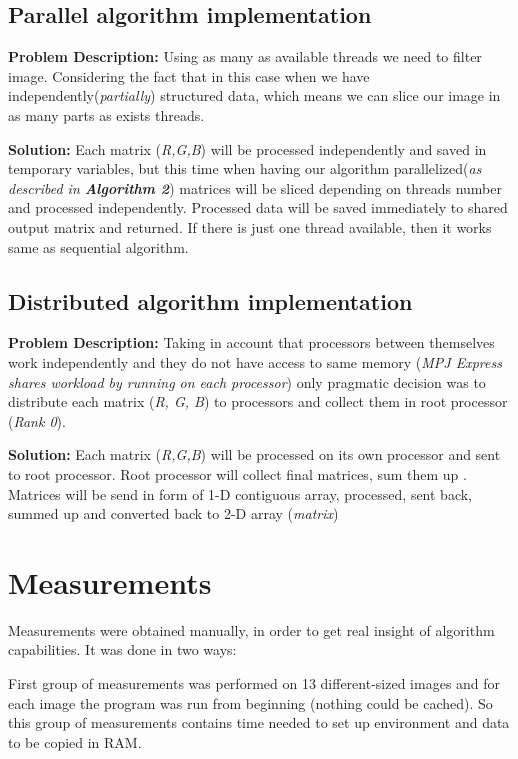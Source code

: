 \documentclass{article}
\begin{document}
\subsection{Parallel algorithm implementation}
\textbf{Problem Description:} Using as many as available threads we need to filter image. Considering the fact that in this case when we have independently(\textit{partially}) structured data, which means we can slice our image in as many parts as exists threads. 

\textbf{Solution:} Each matrix (\textit{R,G,B}) will be processed independently and saved in temporary variables, but this time when having our algorithm parallelized(\textit{as described in \textbf{Algorithm 2}}) matrices will be sliced depending on threads number and processed independently. Processed data will be saved immediately to shared output matrix and returned. If there is just one thread available, then it works same as sequential algorithm.


\subsection{Distributed algorithm implementation}
\textbf{Problem Description:}  Taking in account that processors between themselves work independently and they do not have access to same memory (\textit{MPJ Express shares workload by running on each processor}) only pragmatic decision was to distribute each matrix (\textit{R, G, B}) to processors and collect them in root processor (\textit{Rank 0}).

\textbf{Solution:} Each matrix (\textit{R,G,B}) will be processed on its own processor and sent to root processor. Root processor will collect final matrices, sum them up . Matrices will be send in form of 1-D contiguous array, processed, sent back, summed up and converted back to 2-D array (\textit{matrix})
\section{Measurements}

Measurements were obtained manually, in order to get real insight of algorithm capabilities. It was done in two ways:

 First group of measurements was performed on 13 different-sized images and for each image the program was run from beginning (nothing could be cached). So this group of measurements contains time needed to set up environment  and data to be copied in RAM. 
 
\end{document}

